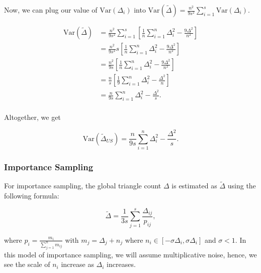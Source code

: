 \documentclass[11pt, margin=1in]{article}
\begin{document}
Now, we can plug our value of $\mathrm{Var}\left(\Delta_i\right)$ into $\mathrm{Var}\left(\tilde{\Delta}\right) = \frac{n^2}{9s^2} \sum_{i=1}^{s} \mathrm{Var}\left(\Delta_i\right)$.

\[
\begin{aligned}
\mathrm{Var}\left(\tilde{\Delta}\right) &= \frac{n^2}{9s^2} \sum_{i=1}^{s} \left[\frac{1}{n} \sum_{i = 1}^{n} \Delta_i^2 - \frac{9\Delta^2}{n^2}\right] \\
&= \frac{n^2}{9s^2} s \left[\frac{1}{n} \sum_{i = 1}^{n} \Delta_i^2 - \frac{9\Delta^2}{n^2}\right] \\
&= \frac{n^2}{9s} \left[\frac{1}{n} \sum_{i = 1}^{n} \Delta_i^2 - \frac{9\Delta^2}{n^2}\right] \\
&= \frac{n}{s} \left[\frac{1}{9}\sum_{i = 1}^{n} \Delta_i^2 - \frac{\Delta^2}{n}\right] \\
&= \frac{n}{9s} \sum_{i = 1}^{n} \Delta_i^2 - \frac{\Delta^2}{s}. \\
\end{aligned}
\]

Altogether, we get

\begin{equation}
    \mathrm{Var}\left(\tilde{\Delta}_{US}\right) = \frac{n}{9s} \sum_{i = 1}^{n} \Delta_i^2 - \frac{\Delta^2}{s}.
\label{eq:Var_Delta_US}
\end{equation}

\subsubsection{Importance Sampling}

For importance sampling, the global triangle count $\Delta$ is estimated as $\tilde{\Delta}$ using the following formula:

\[
\tilde{\Delta} = \frac{1}{3s} \sum_{j = 1}^{s} \frac{\Delta_{ij}}{p_{ij}},
\]

where $p_i = \frac{m_i}{\sum_{j = 1}^{n}m_{ij}}$ with $m_j = \Delta_j + n_j$ where $n_i \in [-\sigma \Delta_i, \sigma \Delta_i]$ and $\sigma < 1$.
In this model of importance sampling, we will assume multiplicative noise, hence, we see the scale of $n_i$ increase as $\Delta_i$ increases.
\end{document}
